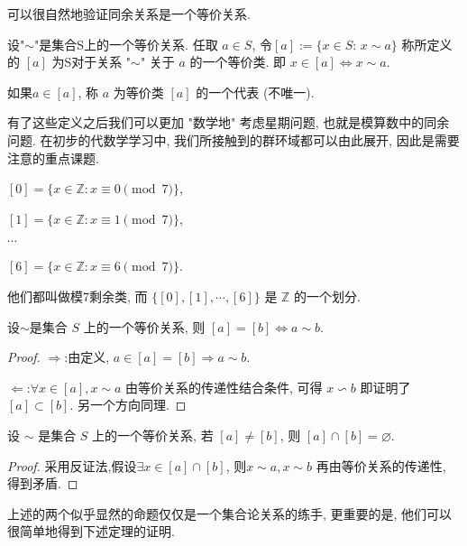 \documentclass[UTF8]{book}
\begin{document}
可以很自然地验证同余关系是一个等价关系.

\begin{definition}
    设"$\sim$"是集合S上的一个等价关系. 
    任取 $ a \in S$, 令$[a]:=\{x\in S:\,x\sim a\}$ 
    称所定义的 $[a]$ 为S对于关系 "$\sim$" 关于 $a$ 的一个等价类.
    即 $x\in [a]\Leftrightarrow x\sim a$. 

    如果$a\in [a]$, 称 $ a$ 为等价类 $[a]$ 的一个代表 (不唯一). 
\end{definition}

有了这些定义之后我们可以更加 "数学地" 考虑星期问题, 也就是模算数中的同余问题. 
在初步的代数学学习中, 我们所接触到的群环域都可以由此展开, 因此是需要注意的重点课题. 

\begin{center}
    $[0]=\{x\in \mathbb{Z}:x\equiv 0\pmod 7 \}$,

    $[1]=\{x\in \mathbb{Z}:x\equiv 1\pmod 7 \}$,

    $\cdots$

    $[6]=\{x\in \mathbb{Z}:x\equiv 6\pmod 7 \}$. 
\end{center}

他们都叫做模7剩余类, 而 
$\{[0],[1],\cdots,[6]\}$ 是 $\mathbb{Z}$ 的一个划分. 

\begin{proposition}
    设$\sim$是集合 $S$ 上的一个等价关系, 则 
    $[a] = [b] \Leftrightarrow a\sim b.$       
\end{proposition}

\begin{proof}
    \textbf{$\Rightarrow$}:\quad 由定义, $a\in [a]=[b] 
    \Rightarrow a\sim b$.
    
    \textbf{$\Leftarrow$}:\quad $\forall x\in [a],x\sim a$ 
    由等价关系的传递性结合条件, 可得 $x\backsim b$
    即证明了$[a]\subset[b]$. 另一个方向同理.
\end{proof}

\begin{proposition}
    设 $\sim$ 是集合 $S$ 上的一个等价关系, 
    若 $[a]\neq [b]$, 则 $[a]\cap [b] = \varnothing $. 
\end{proposition}

\begin{proof}
    采用反证法,假设$\exists x \in [a]\cap [b]$, 则$x\sim a,x\sim b$ 
    再由等价关系的传递性, 得到矛盾.
\end{proof}

上述的两个似乎显然的命题仅仅是一个集合论关系的练手, 
更重要的是, 他们可以很简单地得到下述定理的证明.
\end{document}
